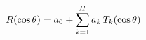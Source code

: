 \documentclass[preview]{standalone}
\begin{document}
\begin{align*}
\special{dvisvgm:raw <g id='unique000'>}R(\cos\theta) = a_0 + \sum_{k=1}^{H} a_k\, T_k(\cos\theta)\special{dvisvgm:raw </g>}
\end{align*}
\end{document}
